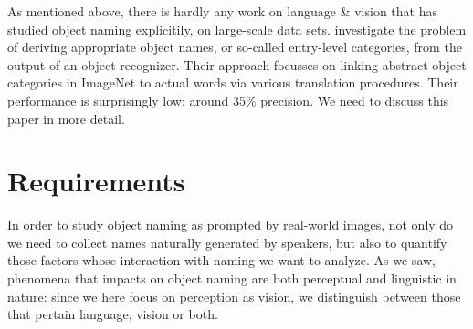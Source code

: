 As mentioned above, there is hardly any work on language \& vision that has studied object naming explicitily, on large-scale data sets. 
\cite{Ordonez:2016} investigate the problem of deriving appropriate object names, or so-called entry-level
 categories, from the output of an object recognizer. Their approach focusses on linking abstract object categories in ImageNet to actual words via various translation procedures. 
 Their performance is surprisingly low: around 35\% precision. We need to discuss this paper in more detail.
 
\section{Requirements}
\label{sec:requirements}
In order to study object naming as prompted by real-world images, not only do we need to collect names naturally generated by speakers, but also to quantify those factors whose interaction with naming we want to analyze. As we saw, phenomena that impacts on object naming are both perceptual and linguistic in nature: since we here focus on perception as vision, we distinguish between those that pertain language, vision or both.

